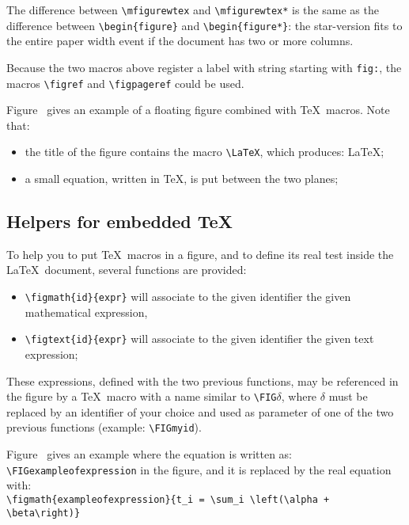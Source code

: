 \documentclass[book,taskpackage,specpackage,codepackage]{upmethodology-document}
\begin{document}
The difference between \texttt{{\textbackslash}mfigurewtex} and \texttt{{\textbackslash}mfigurewtex*} is the same as the difference between \texttt{{\textbackslash}begin\{figure\}} and \texttt{{\textbackslash}begin\{figure*\}}: the star-version fits to the entire paper width event if the document has two or more columns.

Because the two macros above register a label with string starting with \texttt{fig:}, the macros \texttt{{\textbackslash}figref} and \texttt{{\textbackslash}figpageref} could be used.


Figure~ gives an example of a floating figure combined with \TeX\ macros. Note that:
\begin{itemize}
\item the title of the figure contains the macro \texttt{{\textbackslash}LaTeX}, which produces: \LaTeX;
\item a small equation, written in \TeX, is put between the two planes;
\end{itemize}

\subsection{Helpers for embedded \TeX}

To help you to put \TeX\ macros in a figure, and to define its real test inside the \LaTeX\ document, several functions are provided:
\begin{itemize}
\item \texttt{{\textbackslash}figmath\{id\}\{expr\}} will associate to the given identifier the given mathematical expression,
\item \texttt{{\textbackslash}figtext\{id\}\{expr\}} will associate to the given identifier the given text expression;
\end{itemize}

These expressions, defined with the two previous functions, may be referenced in the figure by a \TeX\ macro with a name similar to \texttt{{\textbackslash}FIG$\delta$}, where $\delta$ must be replaced by an identifier of your choice and used as parameter of one of the two previous functions (example: \texttt{{\textbackslash}FIGmyid}).

Figure~ gives an example where the equation is written as: \texttt{{\textbackslash}FIGexampleofexpression} in the figure, and it is replaced by the real equation with: \\
\texttt{{\textbackslash}figmath\{exampleofexpression\}\{t\_i = {\textbackslash}sum\_i {\textbackslash}left({\textbackslash}alpha + {\textbackslash}beta{\textbackslash}right)\}}
\end{document}
